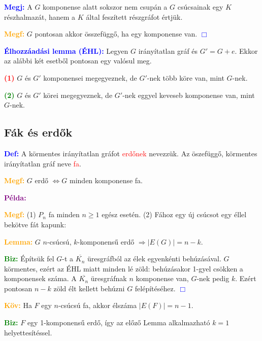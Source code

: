 \documentclass[../szamtud.tex]{subfiles}
\begin{document}
        \textcolor{blue}{\textbf{Megj:}} A $G$ komponense alatt sokszor nem csupán a $G$ csúcsainak egy $K$ részhalmazát, hanem a $K$ által feszített részgráfot értjük.

        \textcolor{orange}{\textbf{Megf:}} $G$ pontosan akkor összefüggő, ha egy komponense van. \textcolor{blue}{$\Box$}

        \textcolor{blue}{\textbf{Élhozzáadási lemma (ÉHL):}} Legyen $G$ irányítatlan gráf és $G' = G + e$. Ekkor az alábbi két esetből pontosan egy valósul meg.

        \textcolor{red}{\textbf{(1)}} $G$ és $G'$ komponensei megegyeznek, de $G'$-nek több köre van, mint $G$-nek.

        \textcolor{green}{\textbf{(2)}} $G$ és $G'$ körei megegyeznek, de $G'$-nek eggyel keveseb komponense van, mint $G$-nek.

    \subsection{Fák és erdők}

        \textcolor{blue}{\textbf{Def:}} A körmentes irányítatlan gráfot \textcolor{red}{erdőnek} nevezzük. Az öszefüggő, körmentes irányítatlan gráf neve \textcolor{red}{fa}.

        \textcolor{orange}{\textbf{Megf:}} $G$ erdő $\Longleftrightarrow  G$ minden komponense fa.

        \textcolor{purple}{\textbf{Példa:}}

        \textcolor{orange}{\textbf{Megf:}} (1) $P_n$ fa minden $n \geq 1$ egész esetén. (2) Fához egy új csúcsot egy éllel bekötve fát kapunk:

        \textcolor{orange}{\textbf{Lemma:}} $G$ $n$-csúcsú, $k$-komponensű erdő $\Rightarrow |E(G)| = n-k$.

        \textcolor{green}{\textbf{Biz:}} Építsük fel $G$-t a $\overline{K_n}$ üresgráfból az élek egyenkénti behúzásával. $G$ körmentes, ezért az ÉHL miatt minden lé zöld: behúzásakor 1-gyel csökken a komponensek száma. A $\overline{K_n}$ üresgráfnak $n$ komponense van, $G$-nek pedig $k$. Ezért pontosan $n-k$ zöld élt kellett behúzni $G$ felépítéséhez. \textcolor{blue}{$\Box$}

        \textcolor{orange}{\textbf{Köv:}} Ha $F$ egy $n$-csúcsú fa, akkor élszáma $|E(F)|=n-1$.

        \textcolor{green}{\textbf{Biz:}} $F$ egy 1-komponensű erdő, így az előző Lemma alkalmazható $k=1$ helyettesítéssel.
\end{document}
